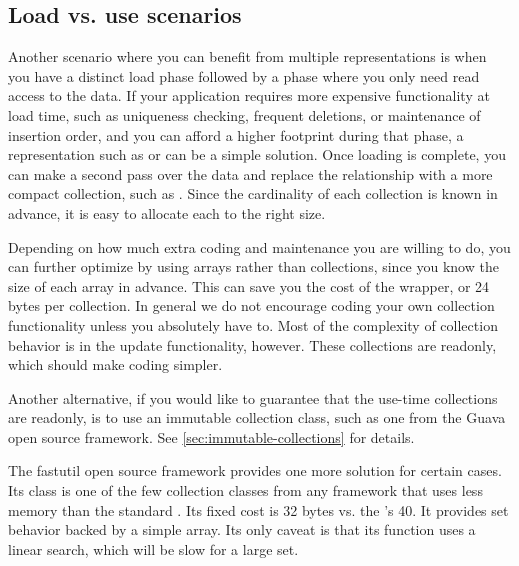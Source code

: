\subsection{Load vs. use scenarios}

Another scenario where you can benefit from multiple representations is when you
have a distinct load phase followed by a phase where you only need read access
to the data. If your application requires more expensive functionality at load
time, such as uniqueness checking, frequent deletions, or maintenance of
insertion order, and you can afford a higher footprint during that phase, a
representation such as  or  can be a simple
solution. Once loading is complete, you can make a second pass over
the data and replace the relationship with a more compact collection, such
as . Since the cardinality of each collection is known in
advance, it is easy to allocate each  to the right size.

Depending on how much extra coding and maintenance you are willing to do, you
can further optimize by using arrays rather than collections, since you know the
size of each array in advance. This can save you
the cost of the  wrapper, or 24 bytes per collection. In
general we do not encourage coding your own collection functionality unless
you absolutely have to.  Most of the complexity of collection
behavior is in the update functionality, however. These collections are
readonly, which should make coding simpler.

Another alternative, if you would like to guarantee that the use-time
collections are readonly, is to use an immutable collection class, such as
one from the Guava open source framework. See
\autoref{sec:immutable-collections} for details.

The fastutil open source framework provides one more
solution for certain cases. Its  class is one of the few
collection classes from any framework that uses less memory than the standard .  Its
fixed cost is 32 bytes vs. the 's 40.  It provides set behavior
backed by a simple array. Its only caveat is that its  function
uses a linear search, which will be slow for a large set. 

